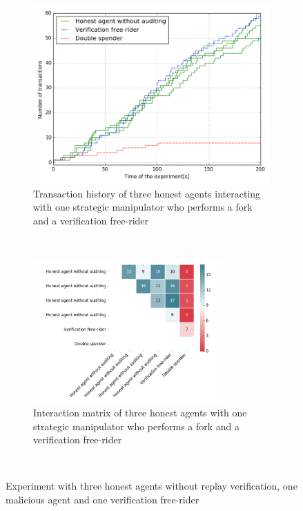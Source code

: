 \begin{figure}[h!]
    \begin{subfigure}{\textwidth}
      \centering
      \includegraphics[width=.7\linewidth]{images/verification_doublespend_honest}
      \caption{Transaction history of three honest agents interacting with one strategic manipulator who performs a fork and a verification free-rider}
      \label{fig:verification_doublespend_honest}
    \end{subfigure}\\
    \begin{subfigure}{\textwidth}
      \centering
      \includegraphics[width=0.8\textwidth]{images/verification_doublespend_honest_matrix}
      \caption{Interaction matrix of three honest agents with one strategic manipulator who performs a fork and a verification free-rider}
      \label{fig:verification_doublespend_honest_matrix}
    \end{subfigure}\\
    \caption{Experiment with three honest agents without replay verification, one malicious agent 
    and one verification free-rider}
    \label{fig:verification_doublespend_honest_combined}
\end{figure}

